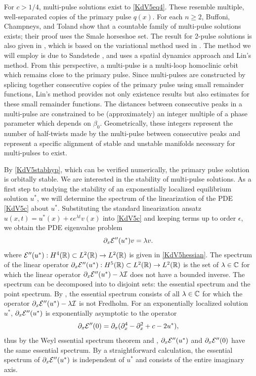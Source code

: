 \documentclass[10pt,reqno]{amsart}
\theoremstyle{plain}
\theoremstyle{definition}
\theoremstyle{remark}
\numberwithin{theorem}{section}
\numberwithin{equation}{section}
\begin{document}
For $c > 1/4$, multi-pulse solutions exist to \cref{KdV5eq4}. These resemble multiple, well-separated copies of the primary pulse $q(x)$. For each $n \geq 2$, Buffoni, Champneys, and Toland \cite{Buffoni1996} show that a countable family of multi-pulse solutions exists; their proof uses the Smale horseshoe set. The result for 2-pulse solutions is also given in \cite[Theorem 2.2]{Pelinovsky2007}, which is based on the variational method used in \cite{Buffoni1996}. The method we will employ is due to Sandstede \cite{Sandstede1993, SandstedeStrut}, and uses a spatial dynamics approach and Lin's method. From this perspective, a multi-pulse is a multi-loop homoclinic orbit which remains close to the primary pulse. Since multi-pulses are constructed by splicing together consecutive copies of the primary pulse using small remainder functions, Lin's method provides not only existence results but also estimates for these small remainder functions. The distances between consecutive peaks in a multi-pulse are constrained to be (approximately) an integer multiple of a phase parameter which depends on $\beta_0$. Geometrically, these integers represent the number of half-twists made by the multi-pulse between consecutive peaks and represent a specific alignment of stable and unstable manifolds necessary for multi-pulses to exist. 

By \cref{KdV5stabhyp}, which can be verified numerically, the primary pulse solution is orbitally stable. We are interested in the stability of multi-pulse solutions. As a first step to studying the stability of an exponentially localized equilibrium solution $u^*$, we will determine the spectrum of the linearization of the PDE \eqref{KdV5c} about $u^*$. Substituting the standard linearization ansatz $u(x, t) = u^*(x) + \epsilon e^{\lambda t} v(x)$ into \eqref{KdV5c} and keeping terms up to order $\epsilon$, we obtain the PDE eigenvalue problem
\begin{equation}\label{KdV5PDEevp}
\partial_x \mathcal{E}''(u^*) v = \lambda v.
\end{equation}
where $\mathcal{E}''(u^*): H^4(\mathbb{R}) \subset L^2(\mathbb{R}) \rightarrow L^2(\mathbb{R})$ is given in \cref{KdV5hessian}. The spectrum of the linear operator $\partial_x \mathcal{E}''(u^*): H^5(\mathbb{R}) \subset L^2(\mathbb{R}) \rightarrow L^2(\mathbb{R})$ is the set of $\lambda \in \mathbb{C}$ for which the linear operator $\partial_x \mathcal{E}''(u^*) - \lambda \mathcal{I}$ does not have a bounded inverse. The spectrum can be decomposed into to disjoint sets: the essential spectrum and the point spectrum. By \cite[Theorem 3.1.11]{Kapitula2013}, the essential spectrum consists of all $\lambda \in \mathbb{C}$ for which the operator $\partial_x \mathcal{E}''(u^*) - \lambda \mathcal{I}$ is not Fredholm. For an exponentially localized solution $u^*$, $\partial_x \mathcal{E}''(u^*)$ is exponentially asymptotic to the operator 
\[
\partial_x \mathcal{E}''(0) = \partial_x(\partial_x^4 - \partial_x^2 + c - 2 u^*),
\]
thus by the Weyl essential spectrum theorem \cite[Theorem 2.2.6]{Kapitula2013} and \cite[Theorem 3.1.11]{Kapitula2013}, $\partial_x \mathcal{E}''(u^*)$ and $\partial_x \mathcal{E}''(0)$ have the same essential spectrum. By a straightforward calculation, the essential spectrum of $\partial_x \mathcal{E}''(u^*)$ is independent of $u^*$ and consists of the entire imaginary axis.
\end{document}
